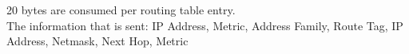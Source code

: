 20 bytes are consumed per routing table entry. \\
The information that is sent: IP Address, Metric, Address Family, Route Tag, IP Address, Netmask, Next Hop, Metric

